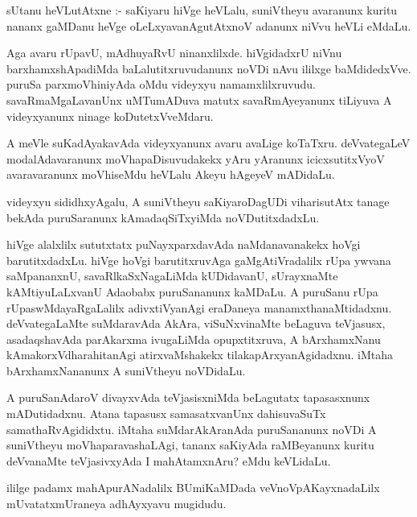 \documentclass{article}
\begin{document}
\begin{mn}
sUtanu heVLutAtxne :- saKiyaru hiVge heVLalu, suniVtheyu avaranunx kuritu nananx 
gaMDanu heVge oLeLxyavanAgutAtxnoV adanunx niVvu heVLi eMdaLu. 
\end{mn}

\begin{mn}
Aga avaru rUpavU, mAdhuyaRvU ninanxlilxde. hiVgidadxrU niVnu barxhamxshApadiMda 
baLalutitxruvudanunx noVDi nAvu ililxge baMdidedxVve. puruSa parxmoVhiniyAda oMdu  
videyxyu  namamxlilxruvudu.  savaRmaMgaLavanUnx uMTumADuva matutx savaRmAyeyanunx  
tiLiyuva A videyxyanunx ninage koDutetxVveMdaru.
\end{mn}

\begin{mn}
A meVle suKadAyakavAda  videyxyanunx  avaru avaLige koTaTxru.  deVvategaLeV 
modalAdavaranunx moVhapaDisuvudakekx  yAru yAranunx icicxsutitxVyoV 
avaravaranunx moVhiseMdu heVLalu Akeyu hAgeyeV mADidaLu. 
\end{mn}

\begin{mn}
videyxyu sididhxyAgalu, A suniVtheyu  saKiyaroDagUDi viharisutAtx  
tanage bekAda  puruSaranunx  kAmadaqSiTxyiMda  noVDutitxdadxLu.
\end{mn}

\begin{mn}
hiVge alalxlilx sututxtatx puNayxparxdavAda naMdanavanakekx hoVgi barutitxdadxLu.  
hiVge hoVgi barutitxruvAga gaMgAtiVradalilx rUpa ywvana saMpananxnU, savaRlkaSxNagaLiMda 
kUDidavanU, sUrayxnaMte kAMtiyuLaLxvanU Adaobabx puruSananunx kaMDaLu. A puruSanu rUpa 
rUpaswMdayaRgaLalilx adivxtiVyanAgi eraDaneya manamxthanaMtidadxnu.  deVvategaLaMte 
suMdaravAda AkAra, viSuNxvinaMte beLaguva teVjasusx, asadaqshavAda  parAkarxma 
ivugaLiMda opupxtitxruva, A bArxhamxNanu kAmakorxVdharahitanAgi atirxvaMshakekx 
tilakapArxyanAgidadxnu.  iMtaha bArxhamxNananunx A suniVtheyu noVDidaLu.
\end{mn}

\begin{mn}
A puruSanAdaroV divayxvAda teVjasisxniMda  beLagutatx tapasasxnunx mADutidadxnu.  
Atana tapasusx samasatxvanUnx dahisuvaSuTx samathaRvAgididxtu.  iMtaha  
suMdarAkAranAda  puruSananunx noVDi A suniVtheyu moVhaparavashaLAgi, tananx 
saKiyAda raMBeyanunx kuritu deVvanaMte  teVjasivxyAda I mahAtamxnAru?  eMdu keVLidaLu.
\end{mn}

\begin{mn}
ililge padamx mahApurANadalilx BUmiKaMDada veVnoVpAKayxnadaLilx  mUvatatxmUraneya adhAyxyavu mugidudu.
\end{mn}
\end{document}
